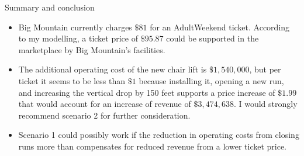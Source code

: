 \documentclass{beamer}
\begin{document}
\begin{frame}{Summary and conclusion}
\begin{itemize}
\item Big Mountain currently charges $\$81$ for an AdultWeekend ticket.
According to my modelling, a ticket price of $\$95.87$ could be
supported in the marketplace by Big Mountain's facilities.

\item The additional operating cost of the new chair lift is $\$1,540,000$, but
per ticket it seems to be less than $\$1$ because installing it, opening a new
run, and increasing the vertical drop by 150 feet supports a price increase of
$\$1.99$ that would account for an increase of revenue of $\$3,474,638$.
I would strongly recommend scenario 2 for further consideration.

\item Scenario 1 could possibly work if the reduction in operating costs from
closing runs more than compensates for reduced revenue from a lower ticket
price.
\end{itemize}
\end{frame}
\end{document}
